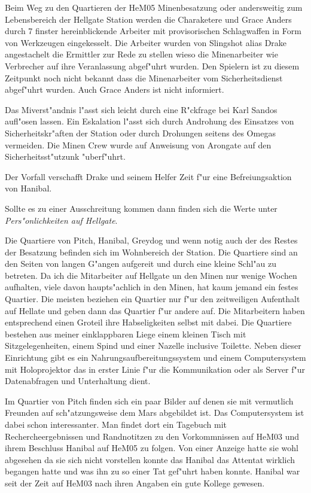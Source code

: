 
Beim Weg zu den Quartieren der HeM05 Minenbesatzung oder andersweitig zum Lebensbereich der Hellgate Station werden die Charaketere und Grace Anders durch 7 finster hereinblickende Arbeiter mit provisorischen Schlagwaffen in Form von Werkzeugen eingekesselt. Die Arbeiter wurden von Slingshot alias Drake angestachelt die Ermittler zur Rede zu stellen wieso die Minenarbeiter wie Verbrecher auf ihre Veranlassung abgef"uhrt wurden. Den Spielern ist zu diesem Zeitpunkt noch nicht bekannt dass die Minenarbeiter vom Sicherheitsdienst abgef"uhrt wurden. Auch Grace Anders ist nicht informiert.

\begin{remarks}
	Das Mi\3verst"andnis l"asst sich leicht durch eine R"ckfrage bei Karl Sandos aufl"osen lassen. Ein Eskalation l"asst sich durch Androhung des Einsatzes von Sicherheitskr"aften der Station oder durch Drohungen seitens des Omegas vermeiden. Die Minen Crew wurde auf Anweisung von Arongate auf den Sicherheitsst"utzunk "uberf"uhrt.
	
	Der Vorfall verschafft Drake und seinem Helfer Zeit f"ur eine Befreiungsaktion von Hanibal.

	Sollte es zu einer Ausschreitung kommen dann finden sich die Werte unter \emph{Pers"onlichkeiten auf Hellgate}.
\end{remarks}


Die Quartiere von Pitch, Hanibal, Greydog und wenn notig auch der des Restes der Besatzung befinden sich im Wohnbereich der Station. Die Quartiere sind an den Seiten von langen G"angen aufgereit und durch eine kleine Schl"au\3 zu betreten. Da ich die Mitarbeiter auf Hellgate un den Minen nur wenige Wochen aufhalten, viele davon haupts"achlich in den Minen, hat kaum jemand ein festes Quartier. Die meisten beziehen ein Quartier nur f"ur den zeitweiligen Aufenthalt auf Hellate und geben dann das Quartier f"ur andere auf. Die Mitarbeitern haben entsprechend einen Gro\3teil ihre Habseligkeiten selbst mit dabei. Die Quartiere bestehen aus meiner einklappbaren Liege einem kleinen Tisch mit Sitzgelegenheiten, einem Spind und einer Na\3zelle inclusive Toilette. Neben dieser Einrichtung gibt es ein Nahrungsaufbereitungssystem und einem Computersystem mit Holoprojektor das in erster Linie f"ur die Kommunikation oder als Server f"ur Datenabfragen und Unterhaltung dient.

Im Quartier von Pitch finden sich ein paar Bilder auf denen sie mit vermutlich Freunden auf sch"atzungsweise dem Mars abgebildet ist. Das Computersystem ist dabei schon interessanter. Man findet dort ein Tagebuch mit Rechercheergebnissen und Randnotitzen zu den Vorkommnissen auf HeM03 und ihrem Beschluss Hanibal auf HeM05 zu folgen. Von einer Anzeige hatte sie wohl abgesehen da sie sich nicht vorstellen konnte das Hanibal das Attentat wirklich begangen hatte und was ihn zu so einer Tat gef"uhrt haben konnte. Hanibal war seit der Zeit auf HeM03 nach ihren Angaben ein gute Kollege gewesen.


